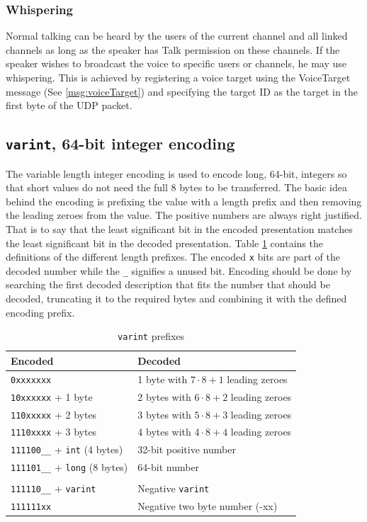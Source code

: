 \documentclass[11pt]{article} %
\begin{document}
\subsubsection{Whispering}
\label{sect:whispering}

Normal talking can be heard by the users of the current channel and all linked channels as long as the speaker has Talk permission on these channels. If the speaker wishes to broadcast the voice to specific users or channels, he may use whispering. This is achieved by registering a voice target using the VoiceTarget message (See \ref{msg:voiceTarget}) and specifying the target ID as the target in the first byte of the UDP packet.

\subsection {\texttt{varint}, 64-bit integer encoding}
\label{sect:varint}

The variable length integer encoding is used to encode long, 64-bit, integers so that short values do not need the full 8 bytes to be transferred. The basic idea behind the encoding is prefixing the value with a length prefix and then removing the leading zeroes from the value. The positive numbers are always right justified. That is to say that the least significant bit in the encoded presentation matches the least significant bit in the decoded presentation. Table \ref{tbl:varint} contains the definitions of the different length prefixes. The encoded \texttt{x} bits are part of the decoded number while the \texttt{\_} signifies a unused bit. Encoding should be done by searching the first decoded description that fits the number that should be decoded, truncating it to the required bytes and combining it with the defined encoding prefix. 

\begin{table}[htp]\begin{center}
	\caption{\texttt{varint} prefixes}\label{tbl:varint}

	\begin{tabular}{ll}
		Encoded & Decoded \\
		\hline
		\texttt{0xxxxxxx} & 1 byte with $7 \cdot 8 + 1$ leading zeroes \\
		\texttt{10xxxxxx} + 1 byte & 2 bytes with $6 \cdot 8 + 2$ leading zeroes \\
		\texttt{110xxxxx} + 2 bytes & 3 bytes with $5 \cdot 8 + 3$ leading zeroes \\
		\texttt{1110xxxx} + 3 bytes & 4 bytes with $4 \cdot 8 + 4$ leading zeroes \\
		\texttt{111100\_\_} + \texttt{int} (4 bytes) & 32-bit positive number \\
		\texttt{111101\_\_} + \texttt{long} (8 bytes) & 64-bit number \\
\\
		\texttt{111110\_\_} + \texttt{varint} & Negative \texttt{varint} \\
		\texttt{111111xx} & Negative two byte number (-xx) \\
	\end{tabular}
\end{center}\end{table}
\end{document}
